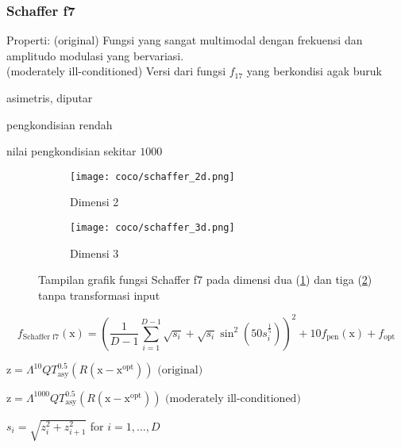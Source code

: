 \subsubsection*{Schaffer f7}
\noindent Properti:
(original) Fungsi yang sangat multimodal dengan frekuensi dan amplitudo modulasi yang bervariasi.\\
(moderately ill-conditioned) Versi dari fungsi $f_{17}$ yang berkondisi agak buruk
\begin{packed_item}
  \item asimetris, diputar
  \item pengkondisian rendah
  \item nilai pengkondisian sekitar $1000$
\end{packed_item}
\begin{figure}[H]
	\centering
	\begin{subfigure}[b]{0.4\textwidth}
		\centering
		\texttt{[image: coco/schaffer\_2d.png]}
		\caption{Dimensi 2}
		\label{fig:schaffer_2d}
	\end{subfigure}
	\hfill
	\begin{subfigure}[b]{0.4\textwidth}
		\centering
		\texttt{[image: coco/schaffer\_3d.png]}
		\caption{Dimensi 3}
		\label{fig:schaffer_3d}
	\end{subfigure}
	\caption{Tampilan grafik fungsi Schaffer f7 pada dimensi dua (\cref{fig:schaffer_2d}) dan tiga (\cref{fig:schaffer_3d}) tanpa transformasi input}
	\label{fig:schaffer_f7}
\end{figure}
\begin{equation}
  f_{\text{Schaffer f7}}(\mathrm{x})=(\frac{1}{D-1}\sum_{i=1}^{D-1}\sqrt{s_i}+\sqrt{s_i}\sin^2(50s_i^{\frac{1}{5}}))^2+10f_{\text{pen}}(\mathrm{x})+f_{\text{opt}}
\end{equation}
\begin{packed_item}
  \item $\mathrm{z}=\Lambda^{10}QT_{\text{asy}}^{0.5}(R(\mathrm{x}-\mathrm{x}^{\text{opt}}))\text{ (original)}$\\
  \item $\mathrm{z}=\Lambda^{1000}QT_{\text{asy}}^{0.5}(R(\mathrm{x}-\mathrm{x}^{\text{opt}}))\text{ (moderately ill-conditioned)}$\\
  \item $s_i=\sqrt{z_i^2+z_{i+1}^2}$ for $i=1,\ldots,D$
\end{packed_item}

